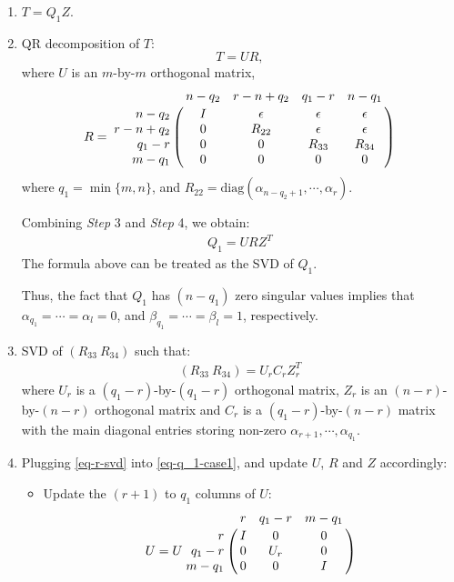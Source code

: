 \begin{enumerate}
\begin{enumerate}
                
\item $T = Q_1Z$.
\item QR decomposition of $T$:
\begin{equation}
T = UR,
\end{equation}
where $U$ is an $m$-by-$m$ orthogonal matrix,
\begin{equation} \label{eq-R-block-case1}
R = \bordermatrix{ & n-q_2 & r-n+q_2 & q_1-r & n-q_1 \cr
\hfill n-q_2 & I & \epsilon & \epsilon & \epsilon \cr
\hfill r-n+q_2 & 0 & R_{22} & \epsilon & \epsilon \cr
\hfill q_1-r & 0 & 0 & R_{33} & R_{34} \cr
\hfill m-q_1 & 0 & 0 & 0 & 0}
\end{equation}
where $q_1 = \min\{m, n\}$,
and $R_{22} = \mbox{diag}(\alpha_{n-q_2+1}, \cdots, \alpha_{r})$.
                    
                    
Combining \textit{Step} 3 and \textit{Step} 4, we obtain:
\begin{align} \label{eq-q_1-case1}
Q_1 = URZ^{T}
\end{align}
The formula above can be treated as the SVD of $Q_1$. 

Thus, the fact that $Q_1$ has $(n-q_1)$ zero singular values implies 
that $\alpha_{q_1} = \cdots = \alpha_{l} = 0$, and 
$\beta_{q_1} = \cdots = \beta_{l} = 1$, respectively. 

\item SVD of $(R_{33} \ R_{34})$ such that:
\begin{align} \label{eq-r-svd}
(R_{33} \ R_{34}) = U_{r}C_{r}Z_{r}^{T}
\end{align}   
where $U_{r}$ is a $(q_1-r)$-by-$(q_1-r)$ orthogonal matrix, 
$Z_{r}$ is an $(n-r)$-by-$(n-r)$ orthogonal matrix and $C_{r}$ 
is a $(q_1-r)$-by-$(n-r)$ matrix with the main diagonal entries 
storing non-zero $\alpha_{r+1}, \cdots, \alpha_{q_1}$.

\item Plugging \eqref{eq-r-svd} into \eqref{eq-q_1-case1}, and  
update $U$, $R$ and $Z$ accordingly:
\begin{itemize}
\item Update the $(r+1)$ to $q_1$ columns of $U$:
\begin{displaymath}
U = U\bordermatrix{ & r & q_1-r & m-q_1 \cr
\hfill r & I & 0 & 0 \cr
\hfill q_1-r & 0 & U_{r} & 0 \cr
\hfill m-q_1 & 0 & 0 & I}
\end{displaymath}


\end{itemize}
\end{enumerate}
\end{enumerate}
